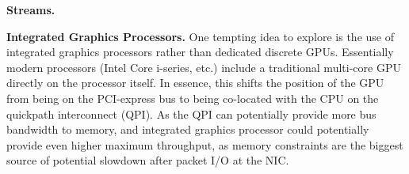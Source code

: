 \medskip \noindent \textbf{Streams.} 

\medskip \noindent \textbf{Integrated Graphics Processors.} One tempting idea to
explore is the use of integrated graphics processors rather than dedicated
discrete GPUs. Essentially modern processors (Intel Core i-series, etc.) include
a traditional multi-core GPU directly on the processor itself. In essence, this
shifts the position of the GPU from being on the PCI-express bus to being
co-located with the CPU on the quickpath interconnect (QPI). As the QPI can
potentially provide more bus bandwidth to memory, and integrated graphics processor could
potentially provide even higher maximum throughput, as memory constraints are
the biggest source of potential slowdown after packet I/O at the NIC.
